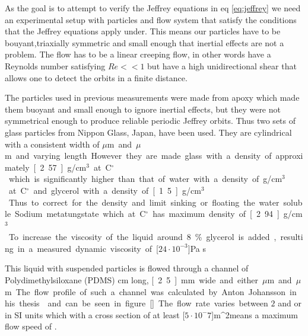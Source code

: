 As the goal is to attempt to verify the Jeffrey equations in eq \ref{eq:jeffrey} we need an experimental setup with particles and flow system that satisfy the conditions that the Jeffrey equations apply under. This means our particles have to be bouyant,triaxially symmetric and small enough that inertial effects are not a problem. The flow has to be a linear creeping flow, in other words have a Reynolds number satisfying $Re << 1$ but have a high unidirectional shear that allows one to detect the orbits in a finite distance.


The particles used in previous measurements were made from apoxy \cite{exjobb:anton} which made them buoyant and small enough to ignore inertial effects, but they were not symmetrical enough to produce reliable periodic Jeffrey orbits. Thus two sets of glass particles from Nippon Glass, Japan\cite{particles}, have been used. They are cylindrical with a consistent width of \unit[3]{$\mu$m} and \unit[5]{$\mu$m} and varying length. 


However they are made glass with a density of approximately \unit[2.57]{g/cm$^3$} at \unit[20]{C$^\circ$} which is significantly higher than that of water with a density of \unit[1]{g/cm$^3$} at \unit[20]{C$^\circ$} and glycerol with a density of \unit[1.5]{g/cm$^3$}. Thus to correct for the density and limit sinking or floating the water soluble Sodium metatungstate which at \unit[20]{C$^\circ$} has maximum density of \unit[2.94]{g/cm$^3$}. To increase the viscosity of the liquid around 8\% glycerol is added, resulting in a measured dynamic viscosity of \unit[$24\cdot 10^{-3}$]{Pa s}


This liquid with suspended particles is flowed through a channel of Polydimethylsiloxane (PDMS) \unit[4]{cm} long, \unit[2.5]{mm} wide and either \unit[200]{$\mu$m} and \unit[500]{$\mu$m}. The flow profile of such a channel was calculated by Anton Johansson in his thesis\cite{AntonThesis} and can be seen in figure \ref{}. The flow rate varies between $2$ and  or in SI units  which with a cross section of at least \unit[$5\cdot 10^-7$]{m^2}means a maximum flow speed of .



